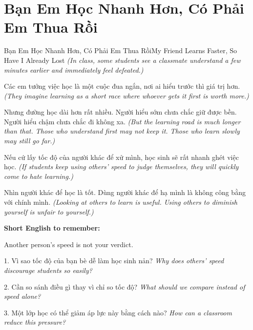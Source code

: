 \section{Bạn Em Học Nhanh Hơn, Có Phải Em Thua Rồi}
\begin{truyen}{Bạn Em Học Nhanh Hơn, Có Phải Em Thua Rồi}{My Friend Learns Faster, So Have I Already Lost}
\textit{(In class, some students see a classmate understand a few minutes earlier and immediately feel defeated.)}

Các em tưởng việc học là một cuộc đua ngắn, nơi ai hiểu trước thì giá trị hơn.
\textit{(They imagine learning as a short race where whoever gets it first is worth more.)}

Nhưng đường học dài hơn rất nhiều. Người hiểu sớm chưa chắc giữ được bền. Người hiểu chậm chưa chắc đi không xa.
\textit{(But the learning road is much longer than that. Those who understand first may not keep it. Those who learn slowly may still go far.)}

Nếu cứ lấy tốc độ của người khác để xử mình, học sinh sẽ rất nhanh ghét việc học.
\textit{(If students keep using others' speed to judge themselves, they will quickly come to hate learning.)}
\end{truyen}

\begin{baihoc}
Nhìn người khác để học là tốt. Dùng người khác để hạ mình là không công bằng với chính mình.
\textit{(Looking at others to learn is useful. Using others to diminish yourself is unfair to yourself.)}
\end{baihoc}

\begin{ghinhoanh}
\textbf{Short English to remember:}

Another person's speed is not your verdict.

\end{ghinhoanh}

\begin{tuhocnhanh}
1. Vì sao tốc độ của bạn bè dễ làm học sinh nản? \textit{Why does others' speed discourage students so easily?}

2. Cần so sánh điều gì thay vì chỉ so tốc độ? \textit{What should we compare instead of speed alone?}

3. Một lớp học có thể giảm áp lực này bằng cách nào? \textit{How can a classroom reduce this pressure?}
\end{tuhocnhanh}
\ngancach

